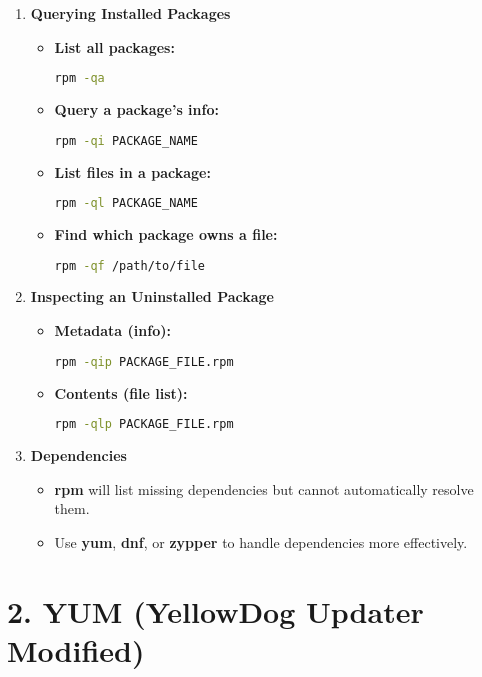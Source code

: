 \documentclass[a4paper]{report}
\begin{document}
\begin{enumerate}
\item \textbf{Querying Installed Packages}
\begin{itemize}
    \item \textbf{List all packages:}
    \begin{lstlisting}[language=bash]
rpm -qa
    \end{lstlisting}
    \item \textbf{Query a package’s info:}
    \begin{lstlisting}[language=bash]
rpm -qi PACKAGE_NAME
    \end{lstlisting}
    \item \textbf{List files in a package:}
    \begin{lstlisting}[language=bash]
rpm -ql PACKAGE_NAME
    \end{lstlisting}
    \item \textbf{Find which package owns a file:}
    \begin{lstlisting}[language=bash]
rpm -qf /path/to/file
    \end{lstlisting}
\end{itemize}

\item \textbf{Inspecting an Uninstalled Package}
\begin{itemize}
    \item \textbf{Metadata (info):}
    \begin{lstlisting}[language=bash]
rpm -qip PACKAGE_FILE.rpm
    \end{lstlisting}
    \item \textbf{Contents (file list):}
    \begin{lstlisting}[language=bash]
rpm -qlp PACKAGE_FILE.rpm
    \end{lstlisting}
\end{itemize}

\item \textbf{Dependencies}
\begin{itemize}
    \item \textbf{rpm} will list missing dependencies but cannot automatically resolve them.
    \item Use \textbf{yum}, \textbf{dnf}, or \textbf{zypper} to handle dependencies more effectively.
\end{itemize}
\end{enumerate}

\section*{2. YUM (YellowDog Updater Modified)}
\end{document}
